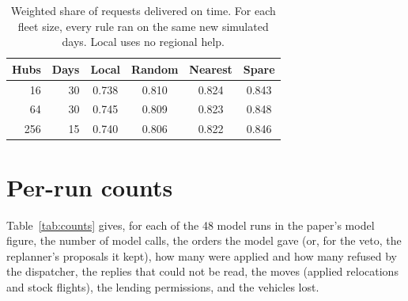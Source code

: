 \documentclass[conference]{IEEEtran}
\begin{document}
\begin{table}[t]
\caption{Weighted share of requests delivered on time. For each fleet
size, every rule ran on the same new simulated days. Local uses no
regional help.}
\label{tab:api}
\centering
\footnotesize
\begin{tabular}{@{}rrcccc@{}}
\toprule
Hubs & Days & Local & Random & Nearest & Spare \\
\midrule
16 & 30 & 0.738 & 0.810 & 0.824 & 0.843 \\
64 & 30 & 0.745 & 0.809 & 0.823 & 0.848 \\
256 & 15 & 0.740 & 0.806 & 0.822 & 0.846 \\
\bottomrule
\end{tabular}
\end{table}

\section{Per-run counts}
\label{app:counts}

Table~\ref{tab:counts} gives, for each of the 48 model runs in
the paper's model figure, the number of model calls, the orders the model
gave (or, for the veto, the replanner's proposals it kept), how many were
applied and how many refused by the dispatcher, the replies that could not
be read, the moves (applied relocations and stock flights), the lending
permissions, and the vehicles lost.

\begin{table}[h]
\caption{Per-run counts for the 48 model runs. Refused orders are those
the dispatcher could not apply, almost all for too few idle vehicles.
Unreadable replies were not JSON in the expected form and changed nothing.}
\label{tab:counts}
\centering
\footnotesize

\end{table}
\end{document}
